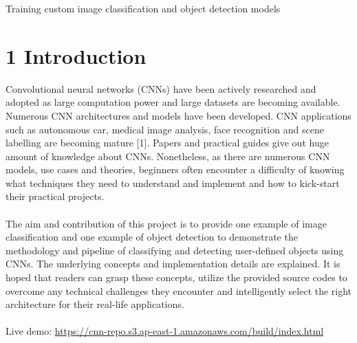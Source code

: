 \documentclass[12pt]{article}
\begin{document}






\begin{center}
\Huge{Training custom image classification and object detection models}
\end{center}

\section*{\large{1 \hspace{10pt} Introduction}}
Convolutional neural networks (CNNs) have been actively researched and adopted as large computation power and large datasets are becoming available. Numerous CNN architectures and models have been developed. CNN applications such as autonomous car, medical image analysis, face recognition and scene labelling are becoming mature [1]. Papers and practical guides give out huge amount of knowledge about CNNs. Nonetheless, as there are numerous CNN models, use cases and theories, beginners often encounter a difficulty of knowing what techniques they need to understand and implement and how to kick-start their practical projects. \\
\\
The aim and contribution of this project is to provide one example of image classification and one example of object detection to demonstrate the methodology and pipeline of classifying and detecting user-defined objects using CNNs. The underlying concepts and implementation details are explained. It is hoped that readers can grasp these concepts, utilize the provided source codes to overcome any technical challenges they encounter and intelligently select the right architecture for their real-life applications. \\
\\
Live demo: \href{https://cnn-repo.s3.ap-east-1.amazonaws.com/build/index.html}{https://cnn-repo.s3.ap-east-1.amazonaws.com/build/index.html}
\end{document}
